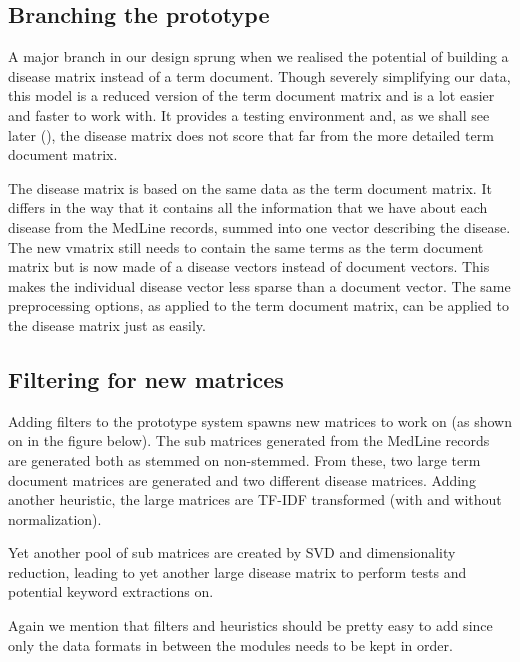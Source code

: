 \subsection{Branching the prototype\label{DiseaseMatrix}}

A major branch in our design sprung when we realised the potential of building a disease matrix instead of a term document. Though severely simplifying our data, this model is a reduced version of the term document matrix and is a lot easier and faster to work with. It provides a testing environment and, as we shall see later (), the disease matrix does not score that far from the more detailed term document matrix.

The disease matrix is based on the same data as the term document matrix. It differs in the way that it contains all the information that we have about each disease from the MedLine records, summed into one vector describing the disease. The new vmatrix still needs to contain the same terms as the term document matrix but is now made of a disease vectors instead of document vectors. This makes the individual disease vector less sparse than a document vector. The same preprocessing options, as applied to the term document matrix, can be applied to the disease matrix just as easily.

\subsection{Filtering for new matrices}

Adding filters to the prototype system spawns new matrices to work on
(as shown on in the figure below). The sub matrices generated from the
MedLine records are generated both as stemmed on non-stemmed. From
these, two large term document matrices are generated and two
different disease matrices. Adding another heuristic, the large
matrices are TF-IDF transformed (with and without normalization).

Yet another pool of sub matrices are created by SVD and dimensionality
reduction, leading to yet another large disease matrix to perform
tests and potential keyword extractions on.

Again we mention that filters and heuristics should be pretty easy to
add since only the data formats in between the modules needs to be
kept in order.

